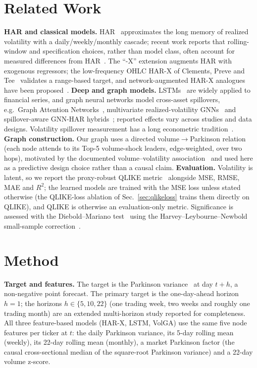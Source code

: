 \documentclass{llncs}
\begin{document}
\section{Related Work}
\textbf{HAR and classical models.} HAR~\cite{corsi2009} approximates the long memory of realized
volatility with a daily/weekly/monthly cascade; recent work reports that rolling-window and
specification choices, rather than model class, often account for measured differences from
HAR~\cite{audrino2025}. The ``-X'' extension augments HAR with exogenous regressors; the low-frequency
OHLC HAR-X of Clements, Preve and Tee~\cite{clements2024} validates a range-based target, and
network-augmented HAR-X analogues have been proposed~\cite{gnarharx2025}.
\textbf{Deep and graph models.} LSTMs~\cite{lstm1997} are widely applied to financial series, and
graph neural networks model cross-asset spillovers, e.g.\ Graph Attention Networks~\cite{gat2018},
multivariate realized-volatility GNNs~\cite{chen2022} and spillover-aware GNN-HAR
hybrids~\cite{gnnhar2025}; reported effects vary across studies and data designs. Volatility spillover
measurement has a long econometric tradition~\cite{dy2012}. \textbf{Graph construction.} Our graph
uses a directed volume$\to$Parkinson relation (each node attends to its Top-5 volume-shock leaders,
edge-weighted, over two hops), motivated by the documented volume--volatility
association~\cite{karpoff1987} and used here as a predictive design choice rather than a causal claim.
\textbf{Evaluation.}
Volatility is latent, so we report the proxy-robust QLIKE metric~\cite{patton2011} alongside MSE, RMSE,
MAE and $R^2$; the learned models are trained with the MSE loss unless stated otherwise (the QLIKE-loss
ablation of Sec.~\ref{sec:qlikeloss} trains them directly on QLIKE), and QLIKE is otherwise an
evaluation-only metric.
Significance is assessed with the Diebold--Mariano test~\cite{dm1995} using the
Harvey--Leybourne--Newbold small-sample correction~\cite{hln1997}.

\section{Method}
\textbf{Target and features.} The target is the Parkinson variance~\cite{parkinson1980} at day
$t{+}h$, a non-negative point forecast. The primary target is the one-day-ahead horizon $h{=}1$;
the horizons $h\in\{5,10,22\}$ (one trading week, two weeks and roughly one trading month) are an
extended multi-horizon study reported for completeness. All three feature-based models (HAR-X, LSTM, VolGA) use the same five
node features per ticker at $t$: the daily Parkinson variance, its 5-day rolling mean (weekly), its
22-day rolling mean (monthly), a market Parkinson factor (the causal cross-sectional median of the
square-root Parkinson variance) and a 22-day volume z-score.
\end{document}
